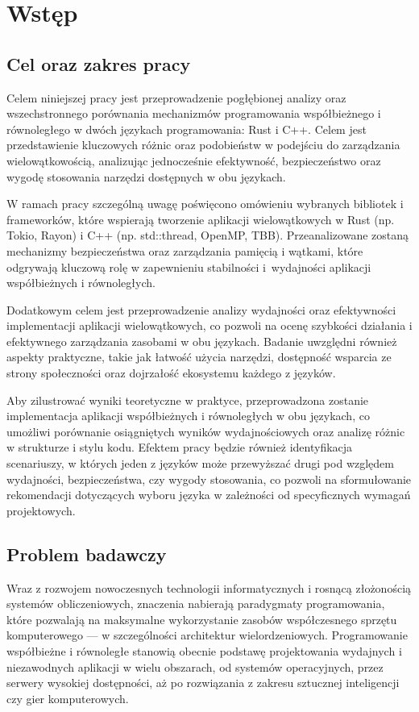 \chapter[Wstęp]{Wstęp}
\section{Cel oraz zakres pracy}
Celem niniejszej pracy jest przeprowadzenie pogłębionej analizy oraz wszechstronnego porównania mechanizmów programowania współbieżnego i równoległego w dwóch językach programowania: Rust i C++. Celem jest przedstawienie kluczowych różnic oraz podobieństw w podejściu do zarządzania wielowątkowością, analizując jednocześnie efektywność, bezpieczeństwo oraz wygodę stosowania narzędzi dostępnych w obu językach.

W ramach pracy szczególną uwagę poświęcono omówieniu wybranych bibliotek i frameworków, które wspierają tworzenie aplikacji wielowątkowych w Rust (np. Tokio, Rayon) i C++ (np. std::thread, OpenMP, TBB). Przeanalizowane zostaną mechanizmy bezpieczeństwa oraz zarządzania pamięcią i wątkami, które odgrywają kluczową rolę w zapewnieniu stabilności i~wydajności aplikacji współbieżnych i równoległych.

Dodatkowym celem jest przeprowadzenie analizy wydajności oraz efektywności implementacji aplikacji wielowątkowych, co pozwoli na ocenę szybkości działania i efektywnego zarządzania zasobami w obu językach. Badanie uwzględni również aspekty praktyczne, takie jak łatwość użycia narzędzi, dostępność wsparcia ze strony społeczności oraz dojrzałość ekosystemu każdego z języków.

Aby zilustrować wyniki teoretyczne w praktyce, przeprowadzona zostanie implementacja aplikacji współbieżnych i równoległych w obu językach, co umożliwi porównanie osiągniętych wyników wydajnościowych oraz analizę różnic w strukturze i stylu kodu. Efektem pracy będzie również identyfikacja scenariuszy, w których jeden z języków może przewyższać drugi pod względem wydajności, bezpieczeństwa, czy wygody stosowania, co pozwoli na sformułowanie rekomendacji dotyczących wyboru języka w zależności od specyficznych wymagań projektowych.
\section{Problem badawczy}
Wraz z rozwojem nowoczesnych technologii informatycznych i rosnącą złożonością systemów obliczeniowych, znaczenia nabierają paradygmaty programowania, które pozwalają na maksymalne wykorzystanie zasobów współczesnego sprzętu komputerowego — w szczególności architektur wielordzeniowych. Programowanie współbieżne i równoległe stanowią obecnie podstawę projektowania wydajnych i niezawodnych aplikacji w wielu obszarach, od systemów operacyjnych, przez serwery wysokiej dostępności, aż po rozwiązania z zakresu sztucznej inteligencji czy gier komputerowych.

